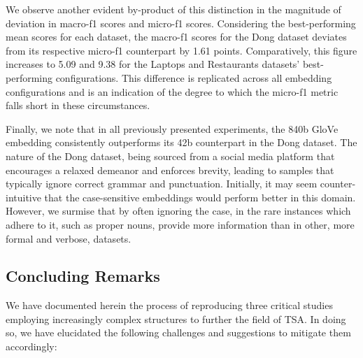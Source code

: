 \documentclass[../../fyp.tex]{subfiles}
\begin{document}
We observe another evident by-product of this distinction in the magnitude of deviation in macro-f1 scores and micro-f1 scores. Considering the best-performing mean scores for each dataset, the macro-f1 scores for the Dong dataset deviates from its respective micro-f1 counterpart by 1.61 points. Comparatively, this figure increases to 5.09 and 9.38 for the Laptops and Restaurants datasets' best-performing configurations. This difference is replicated across all embedding configurations and is an indication of the degree to which the micro-f1 metric falls short in these circumstances.

Finally, we note that in all previously presented experiments, the 840b GloVe embedding consistently outperforms its 42b counterpart in the Dong dataset. The nature of the Dong dataset, being sourced from a social media platform that encourages a relaxed demeanor and enforces brevity, leading to samples that typically ignore correct grammar and punctuation. Initially, it may seem counter-intuitive that the case-sensitive embeddings would perform better in this domain. However, we surmise that by often ignoring the case, in the rare instances which adhere to it, such as proper nouns, provide more information than in other, more formal and verbose, datasets. 

\subsection{Concluding Remarks}
We have documented herein the process of reproducing three critical studies employing increasingly complex structures to further the field of TSA. In doing so, we have elucidated the following challenges and suggestions to mitigate them accordingly: 
\end{document}
